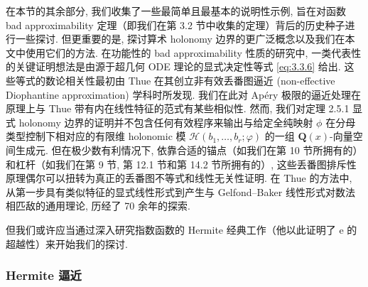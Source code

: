 在本节的其余部分, 我们收集了一些最简单且最基本的说明性示例, 旨在对函数 bad approximability 定理（即我们在第 3.2 节中收集的定理）背后的历史种子进行一些探讨. 
但更重要的是, 探讨算术 holonomy 边界的更广泛概念以及我们在本文中使用它们的方法. 
在功能性的 bad approximability 性质的研究中, 
一类代表性的关键证明想法是由源于超几何 ODE 理论的显式决定性等式 \eqref{eq:3.3.6} 给出. 
这些等式的数论相关性最初由 Thue 在其创立非有效丢番图逼近 (non-effective Diophantine approximation) 学科时所发现. 
我们在此对 Ap{\'e}ry 极限的逼近处理在原理上与 Thue 带有内在线性特征的范式有某些相似性. 
然而, 我们对定理 2.5.1 显式 holonomy 边界的证明并不包含任何有效程序来输出与给定全纯映射 \(\phi\) 在分母类型控制下相对应的有限维 holonomic 模 \(\mathcal{H}(b_1,\ldots,b_r;\varphi)\) 的一组 \(\mathbf{Q}(x)\)-向量空间生成元. 
但在极少数有利情况下, 依靠合适的锚点（如我们在第 10 节所拥有的）和杠杆（如我们在第 9 节, 第 12.1 节和第 14.2 节所拥有的）, 
这些丢番图排斥性原理偶尔可以扭转为真正的丢番图不等式和线性无关性证明. 
在 Thue 的方法中, 从第一步具有类似特征的显式线性形式到产生与 Gelfond--Baker 线性形式对数法相匹敌的通用理论, 历经了 70 余年的探索.

但我们或许应当通过深入研究指数函数的 Hermite 经典工作（他以此证明了 e 的超越性）来开始我们的探讨.

\subsubsection{Hermite 逼近}\label{sec:3.3.1}

